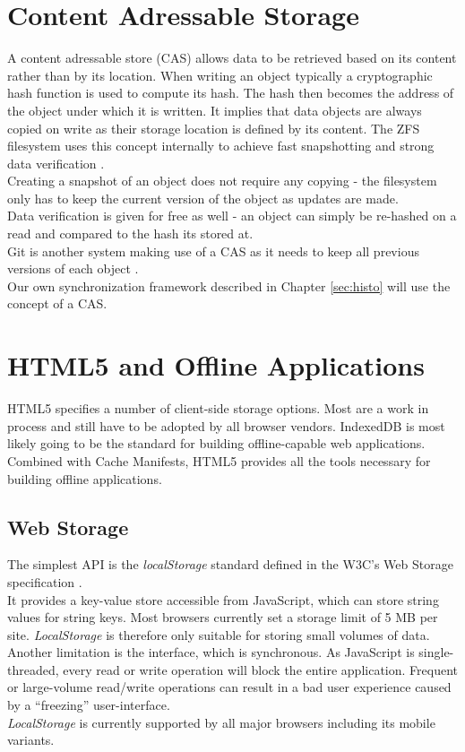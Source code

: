 \section{Content Adressable Storage}
\label{sec:background.cas}
A content adressable store (CAS) allows data to be retrieved based on its content rather than by its location.
When writing an object typically a cryptographic hash function is used to compute its hash.
The hash then becomes the address of the object under which it is written.
It implies that data objects are always copied on write as their storage location is defined by its content.
The ZFS filesystem uses this concept internally to achieve fast snapshotting and strong data verification \cite{strobl2008zfs}.\\
Creating a snapshot of an object does not require any copying - the filesystem only has to keep the current version of the object as updates are made.\\
Data verification is given for free as well - an object can simply be re-hashed on a read and compared to the hash its stored at.\\
Git is another system making use of a CAS as it needs to keep all previous versions of each object \cite{swicegood2008pragmatic}.\\
Our own synchronization framework described in Chapter \ref{sec:histo} will use the concept of a CAS.

\section{HTML5 and Offline Applications}
\label{sec:background.html5}
HTML5 specifies a number of client-side storage options. Most are a work in process and still have to be adopted by all browser vendors. IndexedDB is most likely going to be the standard for building offline-capable web applications. Combined with Cache Manifests, HTML5 provides all the tools necessary for building offline applications.

\subsection{Web Storage}
The simplest API is the \emph{localStorage} standard defined in the W3C's Web Storage specification \cite{webstorage}.\\
It provides a key-value store accessible from JavaScript, which can store string values for string keys.
Most browsers currently set a storage limit of 5 MB per site.
\emph{LocalStorage} is therefore only suitable for storing small volumes of data.\\
Another limitation is the interface, which is synchronous. As JavaScript is single-threaded, every read or write operation will block the entire application.
Frequent or large-volume read/write operations can result in a bad user experience caused by a ``freezing'' user-interface.\\
\emph{LocalStorage} is currently supported by all major browsers including its mobile variants.

